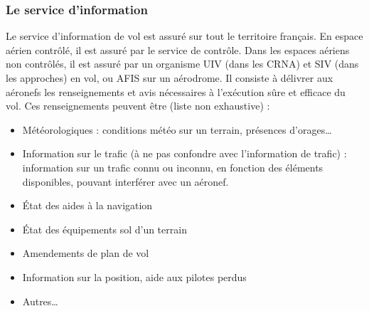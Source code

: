         \subsubsection{Le service d'information}
Le service d'information de vol est assuré sur tout le territoire français. En espace aérien contrôlé, il est assuré par le service de contrôle. Dans les espaces aériens non contrôlés, il est assuré par un organisme UIV (dans les CRNA) et SIV (dans les approches) en vol, ou AFIS sur un aérodrome.
Il consiste à délivrer aux aéronefs les renseignements et avis nécessaires à l'exécution sûre et efficace du vol. Ces renseignements peuvent être (liste non exhaustive) :
\begin{itemize}
\item Météorologiques : conditions météo sur un terrain, présences d'orages…
\item Information sur le trafic (à ne pas confondre avec l'information de trafic) : information sur un trafic connu ou inconnu, en fonction des éléments disponibles, pouvant interférer avec un aéronef.
\item État des aides à la navigation
\item État des équipements sol d'un terrain
\item Amendements de plan de vol
\item Information sur la position, aide aux pilotes perdus
\item Autres…
\end{itemize}\medskip

